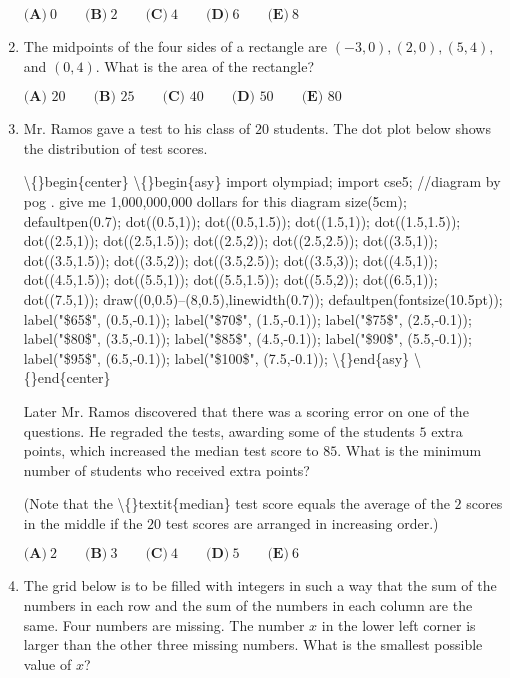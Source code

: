 \documentclass{article}
\begin{document}
\begin{enumerate}[label=\arabic*., itemsep=0.5em]
\(\textbf{(A)} ~0\qquad\textbf{(B)} ~2\qquad\textbf{(C)} ~4\qquad\textbf{(D)} ~6\qquad\textbf{(E)} ~8\)\par \vspace{0.5em}\item The midpoints of the four sides of a rectangle are \((-3,0), (2,0), (5,4),\) and \((0,4).\) What is the
area of the rectangle? 

\(\textbf{(A) } 20 \qquad \textbf{(B) } 25 \qquad \textbf{(C) } 40 \qquad \textbf{(D) } 50 \qquad \textbf{(E) } 80\)\par \vspace{0.5em}\item Mr. Ramos gave a test to his class of \(20\) students. The dot plot below shows the distribution of test scores.

\textbackslash\{\}begin\{center\}
\textbackslash\{\}begin\{asy\}
import olympiad;
import cse5;
//diagram by pog . give me 1,000,000,000 dollars for this diagram
size(5cm);
defaultpen(0.7);
dot((0.5,1));
dot((0.5,1.5));
dot((1.5,1));
dot((1.5,1.5));
dot((2.5,1));
dot((2.5,1.5));
dot((2.5,2));
dot((2.5,2.5));
dot((3.5,1));
dot((3.5,1.5));
dot((3.5,2));
dot((3.5,2.5));
dot((3.5,3));
dot((4.5,1));
dot((4.5,1.5));
dot((5.5,1));
dot((5.5,1.5));
dot((5.5,2));
dot((6.5,1));
dot((7.5,1));
draw((0,0.5)--(8,0.5),linewidth(0.7));
defaultpen(fontsize(10.5pt));
label("\$65\$", (0.5,-0.1));
label("\$70\$", (1.5,-0.1));
label("\$75\$", (2.5,-0.1));
label("\$80\$", (3.5,-0.1));
label("\$85\$", (4.5,-0.1));
label("\$90\$", (5.5,-0.1));
label("\$95\$", (6.5,-0.1));
label("\$100\$", (7.5,-0.1));
\textbackslash\{\}end\{asy\}
\textbackslash\{\}end\{center\}


Later Mr. Ramos discovered that there was a scoring error on one of the questions. He regraded the tests, awarding some of the students \(5\) extra points, which increased the median test score to \(85\). What is the minimum number of students who received extra points?

(Note that the \textbackslash\{\}textit\{median\} test score equals the average of the \(2\) scores in the middle if the \(20\) test scores are arranged in increasing order.)

\(\textbf{(A)} ~2\qquad\textbf{(B)} ~3\qquad\textbf{(C)} ~4\qquad\textbf{(D)} ~5\qquad\textbf{(E)} ~6\qquad\)\par \vspace{0.5em}\item The grid below is to be filled with integers in such a way that the sum of the numbers in each row and the sum of the numbers in each column are the same. Four numbers are missing. The number \(x\) in the lower left corner is larger than the other three missing numbers. What is the smallest possible value of \(x\)?


\end{enumerate}
\end{document}
